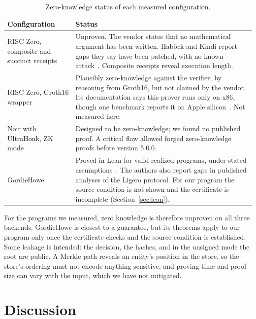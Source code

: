 \documentclass[11pt]{article}
\begin{document}
\begin{table}[t]
\centering
\caption{Zero-knowledge status of each measured configuration.}
\label{tab:zk}
\begin{tabular}{@{}>{\raggedright\arraybackslash}p{}>{\raggedright\arraybackslash}p{}@{}}
\toprule
Configuration & Status \\
\midrule
RISC Zero, composite and succinct receipts & Unproven. The vendor states that no mathematical argument has been written. Hab\"ock and Kindi report gaps they say have been patched, with no known attack~\citep{habock2024note}. Composite receipts reveal execution length. \\
\addlinespace
RISC Zero, Groth16 wrapper & Plausibly zero-knowledge against the verifier, by reasoning from Groth16, but not claimed by the vendor. Its documentation says this prover runs only on x86, though one benchmark reports it on Apple silicon~\citep{yang2026sok}. Not measured here. \\
\addlinespace
Noir with UltraHonk, ZK mode & Designed to be zero-knowledge; we found no published proof. A critical flaw allowed forged zero-knowledge proofs before version 5.0.0. \\
\addlinespace
GordieHowe & Proved in Lean for valid realized programs, under stated assumptions~\citep{sharp2026gordiehowe}. The authors also report gaps in published analyses of the Ligero protocol. For our program the source condition is not shown and the certificate is incomplete (Section~\ref{sec:lean}). \\
\bottomrule
\end{tabular}
\end{table}

For the programs we measured, zero knowledge is therefore unproven on all three backends. GordieHowe is closest to a guarantee, but its theorems apply to our program only once the certificate checks and the source condition is established. Some leakage is intended: the decision, the hashes, and in the unsigned mode the root are public. A Merkle path reveals an entity's position in the store, so the store's ordering must not encode anything sensitive, and proving time and proof size can vary with the input, which we have not mitigated.


\section{Discussion}
\end{document}
